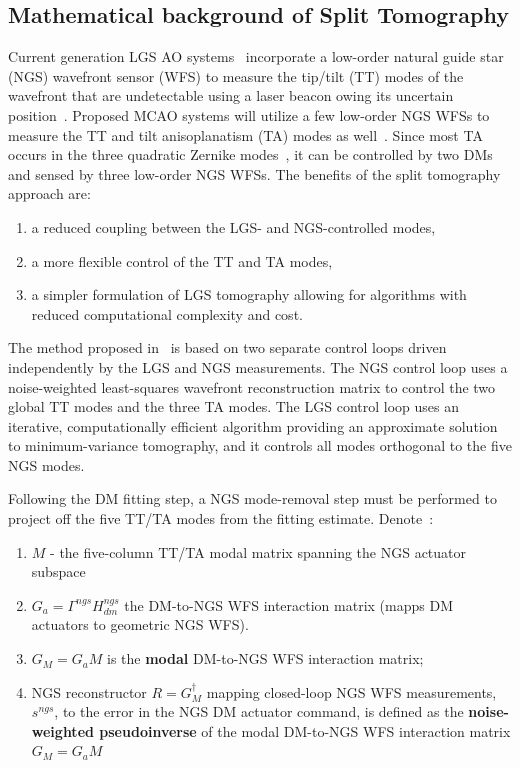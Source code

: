 \documentclass[a4paper,12pt]{article}
\begin{document}
\subsection{Mathematical background of Split Tomography}
Current generation LGS AO systems~\cite{van2006wm} incorporate a low-order natural guide star (NGS) wavefront sensor (WFS) to measure the tip/tilt (TT) modes of the wavefront that are undetectable using a laser beacon owing its uncertain position~\cite{rigaut1992laser}. Proposed MCAO systems will utilize a few low-order NGS WFSs to measure the TT and tilt anisoplanatism (TA) modes as well~\cite{ellerbroek2002wave}. Since most TA occurs in the three quadratic Zernike modes~\cite{ellerbroek2001methods}, it can be controlled by two DMs and sensed by three low-order NGS WFSs. The benefits of the split tomography approach are:
\begin{enumerate}
 \item  a reduced coupling between the LGS- and NGS-controlled modes, 
 \item a more flexible control of the TT and TA modes, 
 \item a simpler formulation of LGS tomography allowing for algorithms with reduced computational complexity and cost.
\end{enumerate}

The method proposed in~\cite{gilles2008split} is based on two separate control loops driven independently by the LGS and NGS measurements. The NGS control loop uses a noise-weighted least-squares wavefront reconstruction matrix to control the two global TT modes and the three TA modes. The LGS control loop uses an iterative, computationally efficient algorithm providing an approximate solution to minimum-variance tomography, and it controls all modes orthogonal to the five NGS modes. 

Following the DM fitting step, a NGS mode-removal step must be performed to project off the five TT/TA modes from the fitting estimate. Denote~\cite{gilles2008split}:
\begin{enumerate}
 \item  $M$ -  the five-column TT/TA modal matrix spanning the NGS actuator subspace
\item  $G_a = \Gamma^{ngs} H_{dm}^{ngs}$ the DM-to-NGS WFS interaction matrix (mapps DM actuators to geometric NGS WFS). 
\item $G_M = G_aM$ is the \textbf{modal} DM-to-NGS WFS interaction matrix;
\item NGS reconstructor $R = G_M^\dagger$ mapping closed-loop NGS WFS measurements, $s^{ngs}$, to the error in the NGS DM actuator command, is defined as the \textbf{noise-weighted pseudoinverse} of the modal DM-to-NGS WFS interaction matrix $G_M = G_aM$
\end{enumerate}
\end{document}
